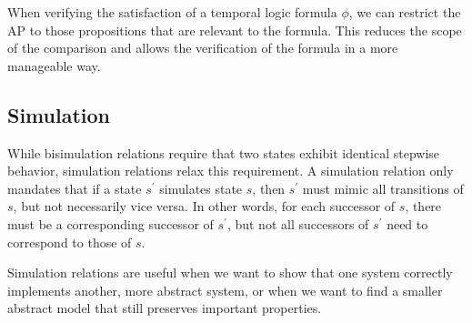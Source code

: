 When verifying the satisfaction of a temporal logic formula $\phi$, we can restrict the AP to those propositions that are relevant to the formula. 
This reduces the scope of the comparison and allows the verification of the formula in a more manageable way.

\subsection{Simulation}
While bisimulation relations require that two states exhibit identical stepwise behavior, simulation relations relax this requirement. 
A simulation relation only mandates that if a state $s^\prime$ simulates state $s$, then $s^\prime$ must mimic all transitions of $s$, but not necessarily vice versa. 
In other words, for each successor of $s$, there must be a corresponding successor of $s^\prime$, but not all successors of $s^\prime$ need to correspond to those of $s$.

Simulation relations are useful when we want to show that one system correctly implements another, more abstract system, or when we want to find a smaller abstract model that still preserves important properties.

